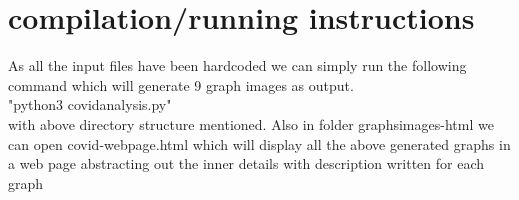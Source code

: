 \section{compilation/running instructions}
As all the input files have been hardcoded we can simply run the following command which will generate 9 graph images as output.\\
"python3 covidanalysis.py" \\with above directory structure mentioned.
Also in folder graphsimages-html we can open covid-webpage.html which will display all the above generated graphs in a web page abstracting out the inner details with description written for each graph